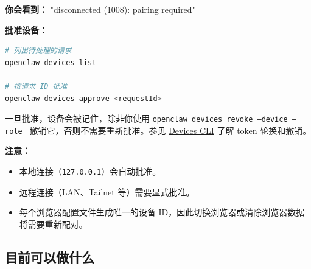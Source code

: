 \textbf{你会看到：} "disconnected (1008): pairing required"

\textbf{批准设备：}

\begin{lstlisting}[language=bash]
# 列出待处理的请求
openclaw devices list

# 按请求 ID 批准
openclaw devices approve <requestId>
\end{lstlisting}


一旦批准，设备会被记住，除非你使用 \texttt{openclaw devices revoke --device  --role } 撤销它，否则不需要重新批准。参见 \href{/cli/devices}{Devices CLI} 了解 token 轮换和撤销。

\textbf{注意：}

\begin{itemize}
  \item 本地连接（\texttt{127.0.0.1}）会自动批准。
  \item 远程连接（LAN、Tailnet 等）需要显式批准。
  \item 每个浏览器配置文件生成唯一的设备 ID，因此切换浏览器或清除浏览器数据将需要重新配对。
\end{itemize}


\subsection{目前可以做什么}


